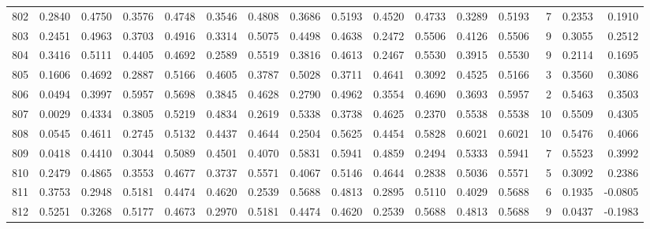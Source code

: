 \begin{tabular}{lrrrrrrrrrrrrrrr}
802 &      0.2840 &  0.4750 &  0.3576 &  0.4748 &  0.3546 &  0.4808 &  0.3686 &  0.5193 &  0.4520 &  0.4733 &   0.3289 &     0.5193 &      7 &                    0.2353 &                     0.1910 \\
803 &      0.2451 &  0.4963 &  0.3703 &  0.4916 &  0.3314 &  0.5075 &  0.4498 &  0.4638 &  0.2472 &  0.5506 &   0.4126 &     0.5506 &      9 &                    0.3055 &                     0.2512 \\
804 &      0.3416 &  0.5111 &  0.4405 &  0.4692 &  0.2589 &  0.5519 &  0.3816 &  0.4613 &  0.2467 &  0.5530 &   0.3915 &     0.5530 &      9 &                    0.2114 &                     0.1695 \\
805 &      0.1606 &  0.4692 &  0.2887 &  0.5166 &  0.4605 &  0.3787 &  0.5028 &  0.3711 &  0.4641 &  0.3092 &   0.4525 &     0.5166 &      3 &                    0.3560 &                     0.3086 \\
806 &      0.0494 &  0.3997 &  0.5957 &  0.5698 &  0.3845 &  0.4628 &  0.2790 &  0.4962 &  0.3554 &  0.4690 &   0.3693 &     0.5957 &      2 &                    0.5463 &                     0.3503 \\
807 &      0.0029 &  0.4334 &  0.3805 &  0.5219 &  0.4834 &  0.2619 &  0.5338 &  0.3738 &  0.4625 &  0.2370 &   0.5538 &     0.5538 &     10 &                    0.5509 &                     0.4305 \\
808 &      0.0545 &  0.4611 &  0.2745 &  0.5132 &  0.4437 &  0.4644 &  0.2504 &  0.5625 &  0.4454 &  0.5828 &   0.6021 &     0.6021 &     10 &                    0.5476 &                     0.4066 \\
809 &      0.0418 &  0.4410 &  0.3044 &  0.5089 &  0.4501 &  0.4070 &  0.5831 &  0.5941 &  0.4859 &  0.2494 &   0.5333 &     0.5941 &      7 &                    0.5523 &                     0.3992 \\
810 &      0.2479 &  0.4865 &  0.3553 &  0.4677 &  0.3737 &  0.5571 &  0.4067 &  0.5146 &  0.4644 &  0.2838 &   0.5036 &     0.5571 &      5 &                    0.3092 &                     0.2386 \\
811 &      0.3753 &  0.2948 &  0.5181 &  0.4474 &  0.4620 &  0.2539 &  0.5688 &  0.4813 &  0.2895 &  0.5110 &   0.4029 &     0.5688 &      6 &                    0.1935 &                    -0.0805 \\
812 &      0.5251 &  0.3268 &  0.5177 &  0.4673 &  0.2970 &  0.5181 &  0.4474 &  0.4620 &  0.2539 &  0.5688 &   0.4813 &     0.5688 &      9 &                    0.0437 &                    -0.1983 \\

\end{tabular}
